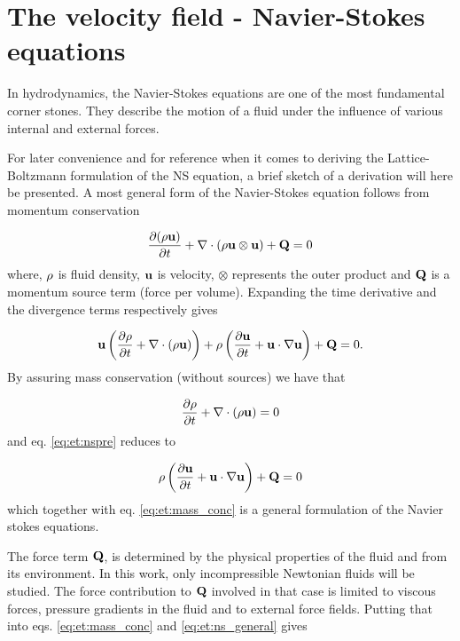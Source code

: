 \section{The velocity field - Navier-Stokes equations}\label{sec:et:ns}
In hydrodynamics, the Navier-Stokes equations are one of the most
fundamental corner stones. They describe the motion of a fluid under
the influence of various internal and external forces. 

For later convenience and for reference when it comes to deriving the
Lattice-Boltzmann formulation of the NS equation, a brief sketch of a
derivation will here be presented. A most general form of the
Navier-Stokes equation follows from momentum conservation

\begin{equation}
\dfrac{\partial (\mathrm{\rho} \mathbf{u})}{\partial t} + \nabla \cdot (\rho \mathbf{u}
\otimes \mathbf{u}) + \mathbf{Q} = 0 
\end{equation}
where, $\mathrm{\rho}$ is fluid density, $\mathbf{u}$ is velocity, $\otimes$
represents the outer product and $\mathbf{Q}$ is a momentum source term
(force per volume). Expanding the time derivative and the divergence
terms respectively gives
 
\begin{equation}\label{eq:et:nspre}
\mathbf{u} \left ( \dfrac{\partial \mathrm{\rho}}{\partial t} + \nabla \cdot
  (\mathrm{\rho} \mathbf{u}) \right ) + \mathrm{\rho} \left (\dfrac{\partial \mathbf{u}}{\partial t} +
  \mathbf{u} \cdot \nabla \mathbf{u} 
  \right ) + \mathbf{Q} = 0.
\end{equation}
By assuring mass conservation (without sources) we have that

\begin{equation}\label{eq:et:mass_conc}
 \dfrac{\partial \mathrm{\rho}}{\partial t} + \nabla \cdot(
  \mathrm{\rho} \mathbf{u}) = 0
\end{equation}
and eq. \eqref{eq:et:nspre} reduces to

\begin{equation}\label{eq:et:ns_general} 
\mathrm{\rho} \left (\dfrac{\partial \mathbf{u}}{\partial t} +
  \mathbf{u} \cdot \nabla \mathbf{u} 
  \right ) + \mathbf{Q} = 0
\end{equation}
which together with eq. \eqref{eq:et:mass_conc} is a general
formulation of the Navier stokes equations. 

The force term $\mathbf{Q}$, is determined by the physical properties of the
fluid and from its environment. In this work, only incompressible
Newtonian fluids will be studied. The force contribution to $\mathbf{Q}$
involved in that case is limited to viscous forces, pressure gradients
in the fluid and to external force fields. Putting that into
eqs. \eqref{eq:et:mass_conc} and \eqref{eq:et:ns_general} gives

